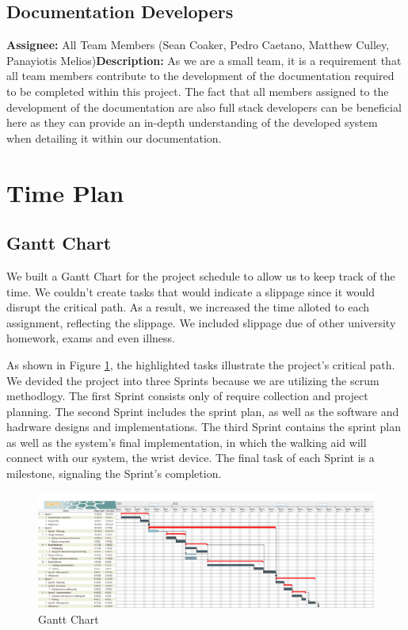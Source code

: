         \subsection{Documentation Developers} \textbf{Assignee: } All Team Members (Sean Coaker, Pedro Caetano, Matthew
        Culley, Panayiotis Melios)\newline \textbf{Description: } As we are a small team, it is a requirement that all
        team members contribute to the development of the documentation required to be completed within this project.
        The fact that all members assigned to the development of the documentation are also full stack developers can be
        beneficial here as they can provide an in-depth understanding of the developed system when detailing it within
        our documentation.

    \section{Time Plan}

        \subsection{Gantt Chart} We built a Gantt Chart for the project schedule to allow us to keep track of the time.
        We couldn't create tasks that would indicate a slippage since it would disrupt the critical path. As a result,
        we increased the time alloted to each assignment, reflecting the slippage. We included slippage due of other
        university homework, exams and even illness.

            As shown in Figure \ref{fig:gantt_chart}, the highlighted tasks illustrate the project's critical path. We
            devided the project into three Sprints because we are utilizing the scrum methodlogy. The first Sprint
            consists only of require collection and project planning. The second Sprint includes the sprint plan, as
            well as the software and hadrware designs and implementations. The third Sprint contains the sprint plan as
            well as the system's final implementation, in which the walking aid will connect with our system, the wrist
            device. The final task of each Sprint is a milestone, signaling the Sprint's completion.

            \begin{figure}[H] \includegraphics[width=\linewidth]{graphics/Gantt_Chart.png} \caption{Gantt Chart}
            \label{fig:gantt_chart} \end{figure}

